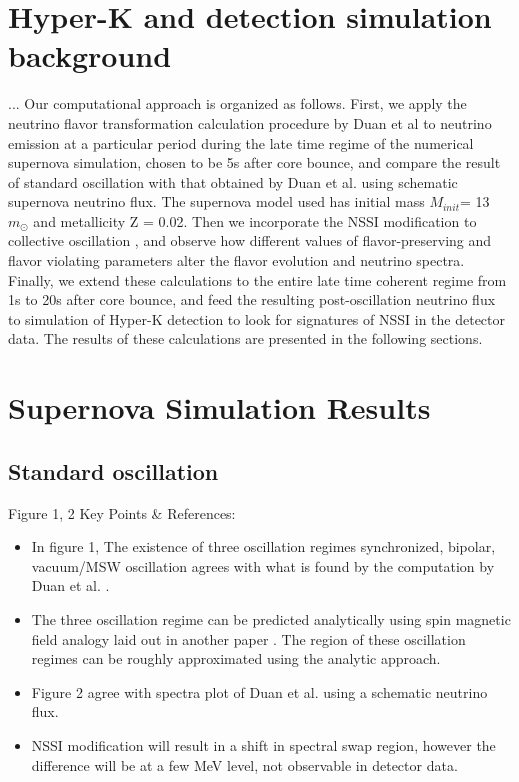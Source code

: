 \documentclass[11pt, oneside]{article}   	%
\begin{document}
\section{Hyper-K and detection simulation background}
...
Our computational approach is organized as follows. First, we apply the neutrino flavor transformation calculation procedure by Duan et al \cite{Duan2} to neutrino emission at a particular period during the late time regime of the numerical supernova simulation, chosen to be 5s after core bounce, and compare the result of standard oscillation with that obtained by Duan et al. using schematic supernova neutrino flux. The supernova model used has initial mass $M_{init}$= 13 $m_{\odot}$ and metallicity Z = 0.02. Then we incorporate the NSSI modification to collective oscillation , and observe how different values of flavor-preserving and flavor violating parameters alter the flavor evolution and neutrino spectra. Finally, we extend these calculations to the entire late time coherent regime from 1s to 20s after core bounce, and feed the resulting post-oscillation neutrino flux to simulation of Hyper-K detection to look for signatures of NSSI in the detector data. The results of these calculations are presented in the following sections.

\section{Supernova Simulation Results}
\subsection{Standard oscillation}
Figure 1, 2 Key Points \& References:
\begin{itemize}
  \item In figure 1, The existence of three oscillation regimes synchronized, bipolar, vacuum/MSW oscillation agrees with what is found by the computation by Duan et al. \cite{Duan1}.
  \item The three oscillation regime can be predicted analytically using spin magnetic field analogy laid out in another paper \cite{Duan3}. The region of these oscillation regimes can be roughly approximated using the analytic approach.
  \item Figure 2 agree with spectra plot of Duan et al. \cite{Duan1} using a schematic neutrino flux.
  \item NSSI modification will result in a shift in spectral swap region, however the difference will be at a few MeV level, not observable in detector data. 
\end{itemize}
\end{document}
